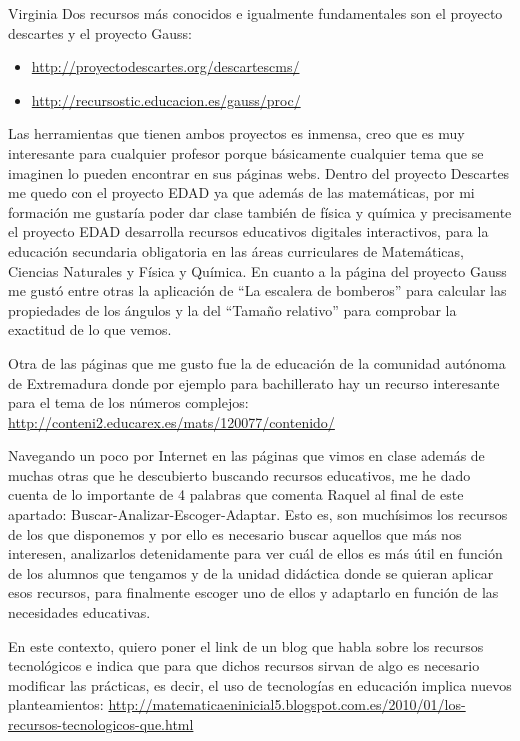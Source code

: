 \begin{opin}{\virgicolor}{Virginia}
Dos recursos más conocidos e igualmente fundamentales son el proyecto descartes y el proyecto Gauss:

\begin{itemize}

\item \url{http://proyectodescartes.org/descartescms/} 

\item \url{http://recursostic.educacion.es/gauss/proc/} 
\end{itemize}

Las herramientas que tienen ambos proyectos es inmensa, creo que es muy interesante para cualquier profesor porque básicamente cualquier tema que se imaginen lo pueden encontrar en sus páginas webs. Dentro del proyecto Descartes me quedo con el proyecto EDAD ya que además de las matemáticas, por mi formación me gustaría poder dar clase también de física y química y precisamente el proyecto EDAD desarrolla recursos educativos digitales interactivos, para la educación secundaria obligatoria en las áreas curriculares de Matemáticas, Ciencias Naturales y Física y Química. En cuanto a la página del proyecto Gauss me gustó entre otras la aplicación de “La escalera de bomberos” para calcular las propiedades de los ángulos y la del “Tamaño relativo” para comprobar la exactitud de lo que vemos.

Otra de las páginas que me gusto fue la de educación de la comunidad autónoma de Extremadura donde por ejemplo para bachillerato hay un recurso interesante para el tema de los números complejos: \url{http://conteni2.educarex.es/mats/120077/contenido/}

Navegando un poco por Internet en las páginas que vimos en clase además de muchas otras que he descubierto buscando recursos educativos, me he dado cuenta de lo importante de 4 palabras que comenta Raquel al final de este apartado: Buscar-Analizar-Escoger-Adaptar. Esto es, son muchísimos los recursos de los que disponemos y por ello es necesario buscar aquellos que más nos interesen, analizarlos detenidamente para ver cuál de ellos es más útil en función de los alumnos que tengamos y de la unidad didáctica donde se quieran aplicar esos recursos, para finalmente escoger uno de ellos y adaptarlo en función de las necesidades educativas.

En este contexto, quiero poner el link de un blog que habla sobre los recursos tecnológicos e indica que para que dichos recursos sirvan de algo es necesario modificar las prácticas, es decir, el uso de tecnologías en educación implica nuevos planteamientos:
\url{http://matematicaeninicial5.blogspot.com.es/2010/01/los-recursos-tecnologicos-que.html}


\end{opin}
